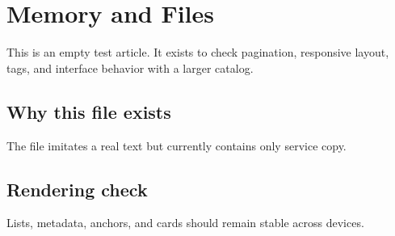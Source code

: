 \section{Memory and Files}

This is an empty test article. It exists to check pagination, responsive layout, tags, and interface behavior with a larger catalog.

\subsection{Why this file exists}

The file imitates a real text but currently contains only service copy.

\subsection{Rendering check}

Lists, metadata, anchors, and cards should remain stable across devices.
